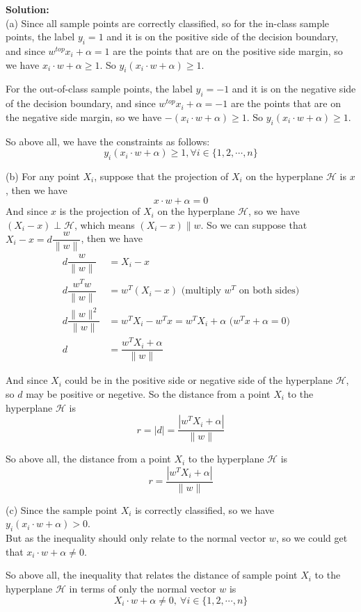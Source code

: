 \documentclass[10pt]{article}
\begin{document}
\begin{enumerate}[1.]
\textbf{Solution:}\\
(a) Since all sample points are correctly classified, so for the in-class sample points, the label $y_i=1$ and it is on the 
positive side of the decision boundary, and since $w^{top}x_i+\alpha=1$ are the points that are on the positive side margin, 
so we have $x_i\cdot w+\alpha\geq 1$.
So $y_i(x_i\cdot w+\alpha)\geq 1$.

For the out-of-class sample points, the label $y_i=-1$ and it is on the negative side of the decision boundary, and since $w^{top}x_i+\alpha=-1$ are the points that are on the negative side margin, 
so we have $-(x_i\cdot w+\alpha)\geq 1$.
So $y_i(x_i\cdot w+\alpha)\geq 1$.

So above all, we have the constraints as follows:
$$y_i(x_i\cdot w+\alpha)\geq 1, \forall i\in\{1,2,\cdots,n\}$$

(b) For any point $X_i$, suppose that the projection of $X_i$ on the hyperplane $\mathcal{H}$ is $x$, then we have
$$x\cdot w+\alpha=0$$
And since $x$ is the projection of $X_i$ on the hyperplane $\mathcal{H}$, so we have $(X_i-x)\perp \mathcal{H}$, which means
$(X_i-x) \parallel w$. So we can suppose that $X_i-x=d \dfrac{w}{\|w\|}$, then we have
\begin{align*}
  d \dfrac{w}{\|w\|}&=X_i - x \\
  d \dfrac{w^Tw}{\|w\|}&=w^T(X_i - x)  \text{ (multiply $w^T$ on both sides)} \\
  d \dfrac{\|w\|^2}{\|w\|}&=w^TX_i - w^Tx = w^TX_i + \alpha \text{ ($w^Tx+\alpha=0$)} \\
  d &= \dfrac{w^TX_i + \alpha}{\|w\|}
\end{align*}

And since $X_i$ could be in the positive side or negative side of the hyperplane $\mathcal{H}$, so $d$ may be positive or negetive.
So the distance from a point $X_i$ to the hyperplane $\mathcal{H}$ is
$$r = |d| = \dfrac{|w^TX_i + \alpha|}{\|w\|}$$

So above all, the distance from a point $X_i$ to the hyperplane $\mathcal{H}$ is
$$r = \dfrac{|w^TX_i + \alpha|}{\|w\|}$$

(c) Since the sample point $X_i$ is correctly classified, so we have $y_i(x_i\cdot w+\alpha)> 0$.\\
But as the inequality should only relate to the normal vector $w$, so we could get that $x_i\cdot w+\alpha\neq 0$.

So above all, the inequality that relates the distance of sample point $X_i$ to the hyperplane $\mathcal{H}$ in terms of only the normal vector $w$ is
$$X_i\cdot w+\alpha\neq 0,\ \forall i\in\{1,2,\cdots,n\}$$


\end{enumerate}
\end{document}

